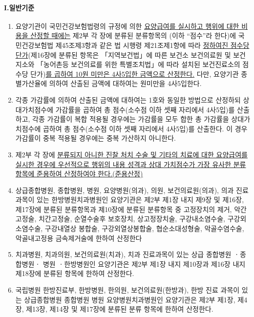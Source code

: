 \paragraph{I.일반기준}
\begin{enumerate}[1.]\tightlist
\item 요양기관이 국민건강보험법령의 규정에 의한 \uline{요양급여를 실시하고 행위에 대한 비용을 산정할 때에는} 제2부 각 장에 분류된 분류항목의 (이하 “점수”라 한다)에 국민건강보험법 제45조제3항과 같은 법 시행령 제21조제1항에 따라 \uline{정하여진 점수당 단가}(제16장에 분류된 항목은 「지역보건법」에 따른 보건소\cntrdot{} 보건의료원 및 보건지소와 「농어촌등 보건의료를 위한 특별조치법」에 따라 설치된 보건진료소의 점수당 단가)\uline{를 곱하여 10원 미만은 4사5입한 금액으로 산정한다.} 다만, 요양기관 종별가산율에 의하여 산출된 금액에 대하여는 원미만을 4사5입한다.
\item 각종 가감률에 의하여 산출된 금액에 대하여는 1호와 동일한 방법으로 산정하되 상대가치점수에 가감률을 곱하여 총 점수(소수점 이하 셋째 자리에서 4사5입)를 산출하고, 각종 가감률이 복합 적용될 경우에는 가감률을 모두 합한 총 가감률을 상대가치점수에 곱하여 총 점수(소수점 이하 셋째 자리에서 4사5입)를 산출한다. 이 경우 가감률이 중복 적용될 경우에는 중복 가산하지 아니한다.
\item 제2부 각 장에 \uline{분류되지 아니한 진찰\cntrdot{} 처치\cntrdot{} 수술 및 기타의 치료에 대한 요양급여를 실시한 경우에 우선적으로 행위의 내용\cntrdot{} 성격과 상대 가치점수가 가장 유사한 분류항목에 준용하여 산정하여야 한다.(준용산정)}
\item 상급종합병원, 종합병원, 병원, 요양병원(의과), 의원, 보건의료원(의과), 의과 진료과목이 있는 한방병원\cntrdot{}치과병원인 요양기관은 제2부 제1장 내지 제9장 및 제16장, 제17장에 분류된 분류항목과 제10장에 분류된 분류항목 중 고정장치의 제거, 악간고정술, 치간고정술, 순열수술후
보호장치, 상고정장치술, 구강내소염수술, 구강외소염수술, 구강내열상 봉합술, 구강외열상봉합술, 협순소대성형술, 악골수염수술, 악골내고정용 금속제거술에 한하여 산정한다
\item 치과병원, 치과의원, 보건의료원(치과), 치과 진료과목이 있는 상급 종합병원 ㆍ종합병원ㆍ 병원
ㆍ한방병원인 요양기관은 제2부 제1장 내지 제10장과 제16장 내지 제18장에 분류된 항목에 한하여 산정한다.
\item 국립병원 한방진료부, 한방병원, 한의원, 보건의료원(한방과), 한방 진료 과목이 있는 상급종합병원\cntrdot{} 종합병원\cntrdot{} 병원\cntrdot{} 요양병원\cntrdot{}치과병원인 요양기관은 제2부 제1장, 제4장, 제13장, 제14장 및 제17장에 분류된 분류 항목에 한하여 산정한다.

\end{enumerate}
